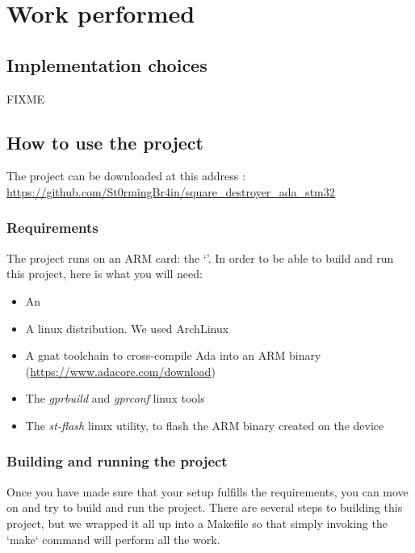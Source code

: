 \section{Work performed}

\subsection{Implementation choices}

FIXME

\subsection{How to use the project}

\begin{noindent}
The project can be downloaded at this address : \\
\url{https://github.com/St0rmingBr4in/square_destroyer_ada_stm32}
\end{noindent}

\subsubsection{Requirements}

The project runs on an ARM card: the `\stmdb'. In order to be able to
build and run this project, here is what you will need:

\begin{itemize}
	\item An \stmdb
	\item A linux distribution. We used ArchLinux
    \item A gnat toolchain to cross-compile Ada into an ARM binary
		(\url{https://www.adacore.com/download})
	\item The \textit{gprbuild} and \textit{gprconf} linux tools
	\item The \textit{st-flash} linux utility, to flash the ARM binary created on the
		  device
\end{itemize}

\subsubsection{Building and running the project}

Once you have made sure that your setup fulfills the requirements, you can
move on and try to build and run the project. There are several steps to
building this project, but we wrapped it all up into a Makefile so that simply
invoking the `make` command will perform all the work.

